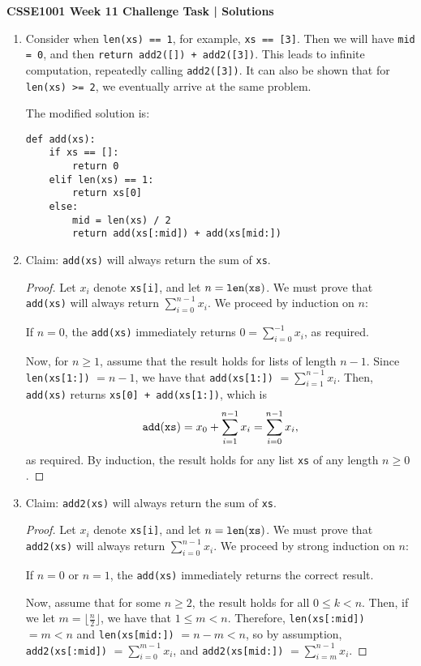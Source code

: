 \documentclass[a4paper,12pt]{article}
\begin{document}
\begin{center}
\bf CSSE1001 Week 11 Challenge Task | Solutions
\end{center}

\begin{enumerate}
\item
Consider when {\tt len(xs) == 1}, for example, {\tt xs == [3]}. Then we will
have {\tt mid = 0}, and then {\tt return add2([]) + add2([3])}. This leads to
infinite computation, repeatedly calling {\tt add2([3])}. It can also be shown
that for {\tt len(xs) >= 2}, we eventually arrive at the same problem.

The modified solution is:
\begin{verbatim}
def add(xs):
    if xs == []:
        return 0
    elif len(xs) == 1:
        return xs[0]
    else:
        mid = len(xs) / 2
        return add(xs[:mid]) + add(xs[mid:])
\end{verbatim}

\item
Claim: {\tt add(xs)} will always return the sum of {\tt xs}.

\begin{proof}
Let $x_i$ denote {\tt xs[i]}, and let $n = {\tt len(xs)}$.
We must prove that {\tt add(xs)} will always return $\sum_{i=0}^{n-1} x_i$.
We proceed by induction on $n$:

If $n = 0$, the {\tt add(xs)} immediately returns $0 = \sum_{i=0}^{-1} x_i$,
as required.

Now, for $n \geq 1$, assume that the result holds for lists of length $n-1$.
Since {\tt len(xs[1:])} $ = n-1$, we have that {\tt add(xs[1:])}
$= \sum_{i=1}^{n-1} x_i$. Then, {\tt add(xs)} returns {\tt xs[0] + add(xs[1:])},
which is
\[
    {\tt add(xs)} = x_0 + \sum_{i=1}^{n-1} x_i = \sum_{i=0}^{n-1} x_i,
\]
as required. By induction, the result holds for any list {\tt xs} of any length
$n \geq 0$.
\end{proof}

\item
Claim: {\tt add2(xs)} will always return the sum of {\tt xs}.

\begin{proof}
Let $x_i$ denote {\tt xs[i]}, and let $n = {\tt len(xs)}$.
We must prove that {\tt add2(xs)} will always return $\sum_{i=0}^{n-1} x_i$.
We proceed by strong induction on $n$:

If $n = 0$ or $n = 1$, the {\tt add(xs)} immediately returns the correct result.

Now, assume that for some $n \geq 2$, the result holds for all $0 \leq k < n$.
Then, if we let $m = \lfloor \frac{n}{2} \rfloor$, we have that $1 \leq m < n$.
Therefore, {\tt len(xs[:mid])} $ = m < n$ and {\tt len(xs[mid:])}
$ = n - m < n$, so by assumption, {\tt add2(xs[:mid])} $ = \sum_{i=0}^{m-1} x_i$,
and {\tt add2(xs[mid:])} $ = \sum_{i=m}^{n-1} x_i$.


\end{proof}
\end{enumerate}
\end{document}

